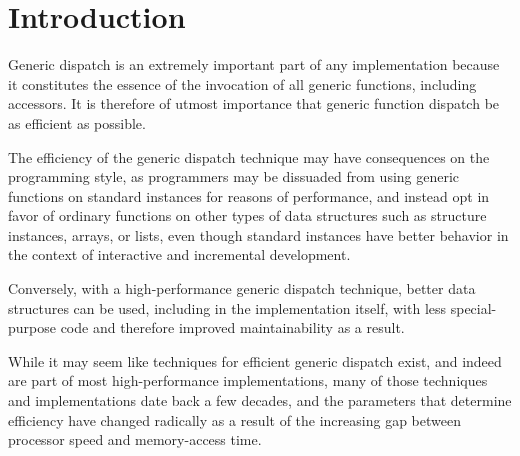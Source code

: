 \section{Introduction}

Generic dispatch is an extremely important part of any \cl{}
implementation because it constitutes the essence of the invocation
of all generic functions, including accessors.  It is therefore of
utmost importance that generic function dispatch be as efficient as
possible. 

The efficiency of the generic dispatch technique may have consequences
on the programming style, as programmers may be dissuaded from using
generic functions on standard instances for reasons of performance,
and instead opt in favor of ordinary functions on other types of data
structures such as structure instances, arrays, or lists, even though
standard instances have better behavior in the context of interactive
and incremental development.

Conversely, with a high-performance generic dispatch technique, better
data structures can be used, including in the implementation itself,
with less special-purpose code and therefore improved maintainability
as a result.

While it may seem like techniques for efficient generic dispatch
exist, and indeed are part of most high-performance \cl{}
implementations, many of those techniques and implementations date
back a few decades, and the parameters that determine efficiency have
changed radically as a result of the increasing gap between processor
speed and memory-access time.
